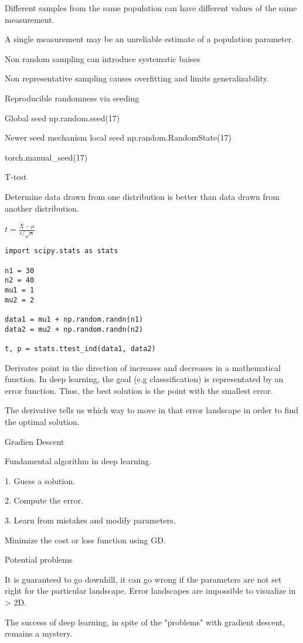 \documentclass[30pt, a4]{article}
\begin{document}
Different samples from the same population can have different values of the 
same measurement.

A single measurement may be an unreliable estimate of a population parameter.

Non random sampling can introduce systematic baises

Non representative sampling causes overfitting and limits generalizability.

Reproducible randomness via seeding

Global seed
np.random.seed(17)

Newer seed mechanism
local seed
np.random.RandomState(17)

torch.manual\_seed(17)

T-test

Determine data drawn from one distribution is better than data drawn from
another distribution.

$t = \frac{\bar X - \mu}{s / \sqrt{n}}$

\begin{lstlisting}
import scipy.stats as stats

n1 = 30
n2 = 40
mu1 = 1
mu2 = 2

data1 = mu1 + np.random.randn(n1)
data2 = mu2 + np.random.randn(n2)

t, p = stats.ttest_ind(data1, data2)
\end{lstlisting}
Derivates point in the direction of increases and decreases in a mathematical
function. In deep learning, the goal (e.g classsification) is representated by
an error function. Thus, the best solution is the point with the smallest error.

The derivative tells us which way to move in that error landscape in order to 
find the optimal solution.

Gradien Descent

Fundamental algorithm in deep learning. 

1. Guess a solution.

2. Compute the error.

3. Learn from mistakes and modify parameters.

Minimize the cost or loss function using GD.

Potential problems

It is guaranteed to go downhill, it can go wrong if the parameters are not set
right for the particular landscape. Error landscapes are impossible to visualize
in > 2D.

The success of deep learning, in spite of the "problems" with gradient descent,
remains a mystery.
\end{document}
